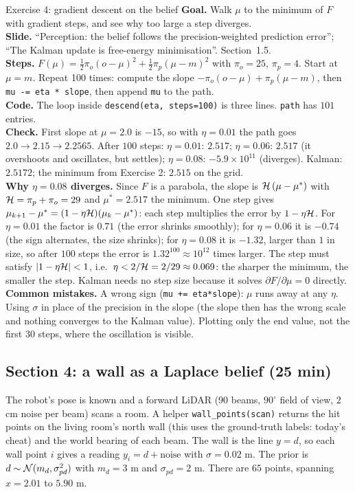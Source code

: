 \documentclass[11pt]{article}
\begin{document}
\begin{labhelp}{Exercise 4: gradient descent on the belief}
\textbf{Goal.} Walk $\mu$ to the minimum of $F$ with gradient steps, and see why too large a step diverges.\\
\textbf{Slide.} ``Perception: the belief follows the precision-weighted prediction error''; ``The Kalman update is free-energy minimisation''. Section~1.5.\\
\textbf{Steps.} $F(\mu)=\tfrac12\pi_o(o-\mu)^2+\tfrac12\pi_p(\mu-m)^2$ with $\pi_o=25$, $\pi_p=4$. Start at $\mu=m$. Repeat 100 times: compute the slope $-\pi_o(o-\mu)+\pi_p(\mu-m)$, then \texttt{mu -= eta * slope}, then append \texttt{mu} to the path.\\
\textbf{Code.} The loop inside \texttt{descend(eta, steps=100)} is three lines. \texttt{path} has $101$ entries.\\
\textbf{Check.} First slope at $\mu=2.0$ is $-15$, so with $\eta=0.01$ the path goes $2.0\to2.15\to2.2565$. After $100$ steps: $\eta=0.01$: $2.517$; $\eta=0.06$: $2.517$ (it overshoots and oscillates, but settles); $\eta=0.08$: $-5.9\times10^{11}$ (diverges). Kalman: $2.5172$; the minimum from Exercise 2: $2.515$ on the grid.\\
\textbf{Why $\eta=0.08$ diverges.} Since $F$ is a parabola, the slope is $\mathcal{H}\,(\mu-\mu^*)$ with $\mathcal{H}=\pi_p+\pi_o=29$ and $\mu^*=2.517$ the minimum. One step gives $\mu_{k+1}-\mu^* = (1-\eta\mathcal{H})(\mu_k-\mu^*)$: each step multiplies the error by $1-\eta\mathcal{H}$. For $\eta=0.01$ the factor is $0.71$ (the error shrinks smoothly); for $\eta=0.06$ it is $-0.74$ (the sign alternates, the size shrinks); for $\eta=0.08$ it is $-1.32$, larger than $1$ in size, so after $100$ steps the error is $1.32^{100}\approx10^{12}$ times larger. The step must satisfy $|1-\eta\mathcal{H}|<1$, i.e.\ $\eta<2/\mathcal{H}=2/29\approx0.069$: the sharper the minimum, the smaller the step. Kalman needs no step size because it solves $\partial F/\partial\mu=0$ directly.\\
\textbf{Common mistakes.} A wrong sign (\texttt{mu += eta*slope}): $\mu$ runs away at any $\eta$. Using $\sigma$ in place of the precision in the slope (the slope then has the wrong scale and nothing converges to the Kalman value). Plotting only the end value, not the first $30$ steps, where the oscillation is visible.
\end{labhelp}

\subsection*{Section 4: a wall as a Laplace belief (25 min)}
The robot's pose is known and a forward LiDAR (90 beams, $90^\circ$ field of view, $2$ cm noise per beam) scans a room. A helper \texttt{wall\_points(scan)} returns the hit points on the living room's north wall (this uses the ground-truth labels: today's cheat) and the world bearing of each beam. The wall is the line $y=d$, so each wall point $i$ gives a reading $y_i=d+\text{noise}$ with $\sigma=0.02$ m. The prior is $d\sim\mathcal{N}(m_d,\sigma_{pd}^2)$ with $m_d=3$ m and $\sigma_{pd}=2$ m. There are $65$ points, spanning $x=2.01$ to $5.90$ m.
\end{document}
